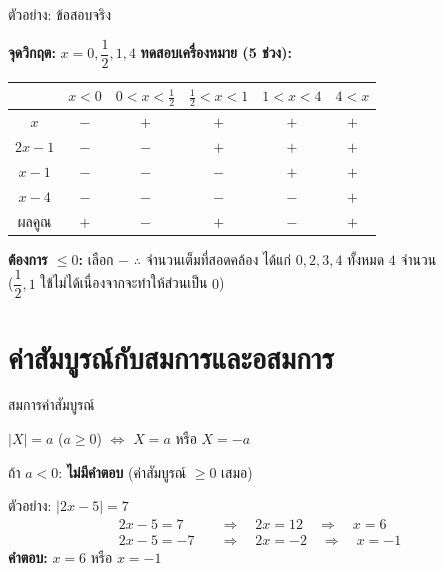 \documentclass[11pt, aspectratio=169]{beamer}
\begin{document}
\begin{frame}{ตัวอย่าง: ข้อสอบจริง}
  \begin{solbox}[วิธีทำ]
      \textbf{จุดวิกฤต:} $x = 0, \dfrac{1}{2},1,4$
      \textbf{ทดสอบเครื่องหมาย (5 ช่วง):}

      \small
      \begin{tabular}{c|ccccc}
                      & $x<0$ & $0<x<\frac{1}{2}$ & $\frac{1}{2}<x<1$ & $1<x<4$ & $4<x$ \\
        \hline
        $x$          & $-$    & $+$      & $+$     & $+$     & $+$   \\
        $2x-1$       & $-$    & $-$      & $+$     & $+$     & $+$   \\
        $x-1$        & $-$    & $-$      & $-$     & $+$     & $+$   \\
        $x-4$        & $-$    & $-$      & $-$     & $-$     & $+$   \\
        \hline
        ผลคูณ          & $+$    & $-$      & $+$     & $-$     & $+$
      \end{tabular}
      \normalsize

      \textbf{ต้องการ $\leq 0$:} เลือก $-$
      $\therefore$ จำนวนเต็มที่สอดคล้อง ได้แก่ $0,2,3,4$ ทั้งหมด $4$ จำนวน 
      \\($\dfrac{1}{2},1$ ใช้ไม่ได้เนื่องจากจะทำให้ส่วนเป็น $0$) 
  \end{solbox}  
\end{frame}
\section{ค่าสัมบูรณ์กับสมการและอสมการ}

\begin{frame}{สมการค่าสัมบูรณ์}
  \begin{explanation}[หลักการ]
    $|X| = a$ \quad ($a \geq 0$) \quad $\iff$ \quad $X = a$ หรือ $X = -a$

    \medskip
    ถ้า $a < 0$: \textbf{ไม่มีคำตอบ} (ค่าสัมบูรณ์ $\geq 0$ เสมอ)
  \end{explanation}

  \begin{exambox}
    ตัวอย่าง: $|2x - 5| = 7$
    \begin{align*}
      2x - 5 = 7 \quad &\Rightarrow \quad 2x = 12 \quad \Rightarrow \quad x = 6 \\
      2x - 5 = -7 \quad &\Rightarrow \quad 2x = -2 \quad \Rightarrow \quad x = -1
    \end{align*}
    \textbf{คำตอบ:} $x = 6$ หรือ $x = -1$
  \end{exambox}
\end{frame}
\end{document}
